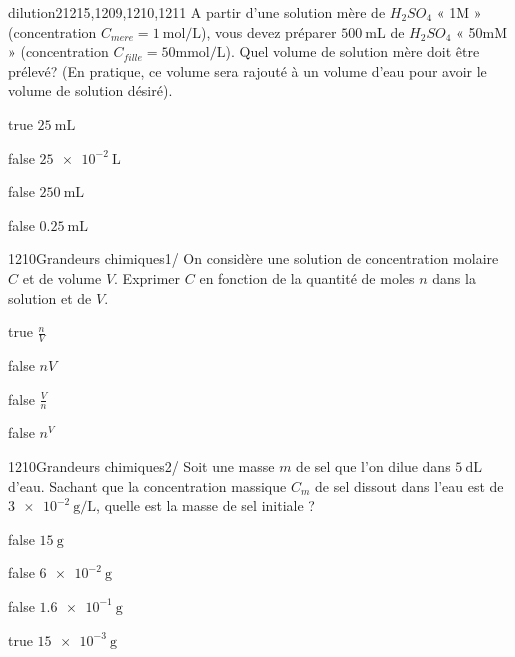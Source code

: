 \documentclass[11pt]{article}
\begin{document}
			
	
             \begin{question}{}{dilution}{2}{1215,1209,1210,1211}
				 A partir d’une solution mère de $H_2SO_4$ « 1M »  (concentration $C_{mere} = \SI{1} {\mole\per\liter}$), vous devez préparer $\SI{500}{\milli\liter}$ de $H_2SO_4$ « 50mM » (concentration $C_{fille} = 50 \si{\milli\mole\per\liter}$). Quel volume de solution mère doit être prélevé?  (En pratique, ce volume sera rajouté à un volume d'eau pour avoir le volume de solution désiré).
            \end{question}

            \begin{reponses}
            	\item[true]  $\SI{25}{\milli\liter} $
            	\item[false]  $ \SI{25e-2}{\liter} $
                \item[false]   $ \SI{250}{\milli\liter} $
                \item[false]  $ \SI{0.25}{\milli\liter} $
            \end{reponses}
        

        	\begin{question}{1210}{Grandeurs chimiques}{1}{/}
				On considère une solution de concentration molaire $C$ et de volume $V$. Exprimer $C$ en fonction de la quantité de moles $n$ dans la solution et de  $V$. 
            \end{question}

            \begin{reponses}
            	\item[true]  $\frac{n}{V}$
            	\item[false] $ n V$
                \item[false] $ \frac{V}{n}$
                \item[false] $ n^{V}$
            \end{reponses}
            
            \begin{question}{1210}{Grandeurs chimiques}{2}{/}
				Soit une masse $m$ de sel que l'on dilue dans $\SI{5}{\deci\liter}$ d'eau. Sachant que la concentration massique $C_m$ de sel dissout dans l'eau est de $\SI{3e-2}{\gram\per\liter}$, quelle est la masse de sel initiale ?  
            \end{question}

            \begin{reponses}
            	\item[false] $\SI{15}{\gram}$
            	\item[false] $\SI{6e-2}{\gram}$
                \item[false] $\SI{1,6e-1}{\gram}$
                \item[true]  $\SI{15e-3}{\gram}$
            \end{reponses}
            
\end{document}
